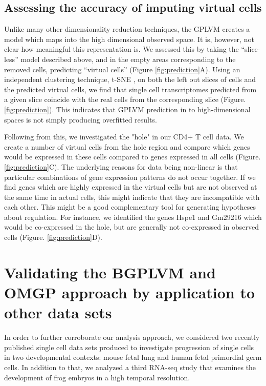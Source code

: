 \subsection{Assessing the accuracy of imputing virtual cells}

Unlike many other dimensionality reduction techniques, the GPLVM creates a model which maps into the high dimensional observed space. It is, however, not clear how meaningful this representation is. We assessed this by taking the ``slice-less'' model described above, and in the empty areas corresponding to the removed cells, predicting ``virtual cells'' (Figure \ref{fig:prediction}A). Using an independent clustering technique, t-SNE \cite{Van_der_Maaten2008-lh}, on both the left out slices of cells and the predicted virtual cells, we find that single cell transcriptomes predicted from a given slice coincide with the real cells from the corresponding slice (Figure. \ref{fig:prediction}). This indicates that GPLVM prediction in to high-dimensional spaces is not simply producing overfitted results.

Following from this, we investigated the "hole" in our CD4+ T cell data. We create a number of virtual cells from the hole region and compare which genes would be expressed in these cells compared to genes expressed in all cells (Figure. \ref{fig:prediction}C). The underlying reasons for data being non-linear is that particular combinations of gene expression patterns do not occur together. If we find genes which are highly expressed in the virtual cells but are not observed at the same time in actual cells, this might indicate that they are incompatible with each other. This might be a good complementary tool for generating hypotheses about regulation. For instance, we identified the genes Hspe1 and Gm29216 which would be co-expressed in the hole, but are generally not co-expressed in observed cells (Figure. \ref{fig:prediction}D).

\section{Validating the BGPLVM and OMGP approach by application to other data sets}

In order to further corroborate our analysis approach, we considered two recently published single cell data sets produced to investigate progression of single cells in two developmental contexts: mouse fetal lung and human fetal primordial germ cells. In addition to that, we analyzed a third RNA-seq study that examines the development of frog embryos in a high temporal resolution.

